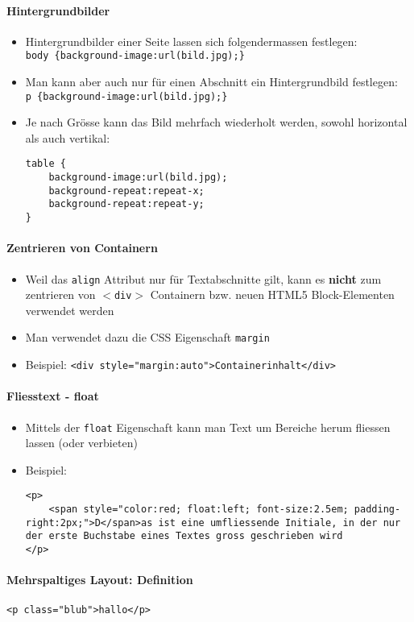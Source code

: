 \paragraph{Hintergrundbilder}
\begin{itemize}[noitemsep,topsep=0pt,leftmargin=*]
    \item Hintergrundbilder einer Seite lassen sich folgendermassen festlegen:\\
    \verb|body {background-image:url(bild.jpg);}|
    \item Man kann aber auch nur für einen Abschnitt ein Hintergrundbild festlegen:\\
    \verb|p {background-image:url(bild.jpg);}|
    \item Je nach Grösse kann das Bild mehrfach wiederholt werden, sowohl horizontal als auch vertikal:
    \begin{lstlisting}
table {
    background-image:url(bild.jpg);
    background-repeat:repeat-x;
    background-repeat:repeat-y;
}
    \end{lstlisting}
\end{itemize}

\paragraph{Zentrieren von Containern}
\begin{itemize}[noitemsep,topsep=0pt,leftmargin=*]
    \item Weil das \texttt{align} Attribut nur für Textabschnitte gilt, kann es \textbf{nicht} zum zentrieren von \texttt{$<$div$>$} Containern bzw. neuen HTML5 Block-Elementen verwendet werden
    \item Man verwendet dazu die CSS Eigenschaft \texttt{margin}
    \item Beispiel:
    \verb|<div style="margin:auto">Containerinhalt</div>|
\end{itemize}

\paragraph{Fliesstext - float}
\begin{itemize}[noitemsep,topsep=0pt,leftmargin=*]
    \item Mittels der \texttt{float} Eigenschaft kann man Text um Bereiche herum fliessen lassen (oder verbieten)
    \item Beispiel:
    \begin{lstlisting}
<p>
    <span style="color:red; float:left; font-size:2.5em; padding-right:2px;">D</span>as ist eine umfliessende Initiale, in der nur der erste Buchstabe eines Textes gross geschrieben wird
</p>
    \end{lstlisting}
\end{itemize}

\paragraph{Mehrspaltiges Layout: Definition}\lstinline|<p class="blub">hallo</p>|
